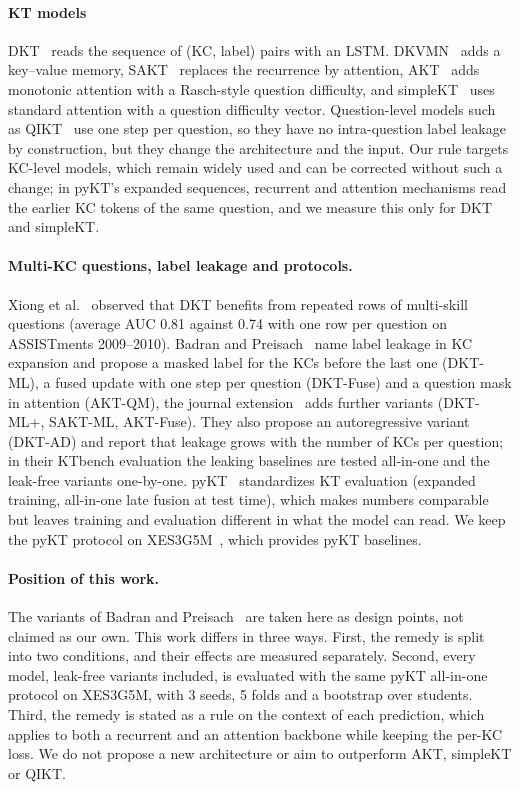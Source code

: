 \paragraph{KT models}
DKT~\cite{piech2015deep} reads the sequence of (KC, label) pairs with an LSTM. 
DKVMN~\cite{zhang2017dynamic} adds a key--value memory, SAKT~\cite{pandey2019self} replaces the recurrence by attention, AKT~\cite{ghosh2020context} adds monotonic attention with a Rasch-style question difficulty, and simpleKT~\cite{DBLP:conf/iclr/0001L0H023} uses standard attention with a question difficulty vector. 
Question-level models such as QIKT~\cite{chen2023improving} use one step per question, so they have no intra-question label leakage by construction, but they change the architecture and the input. 
Our rule targets KC-level models, which remain widely used and can be corrected without such a change; in pyKT's expanded sequences, recurrent and attention mechanisms read the earlier KC tokens of the same question, and we measure this only for DKT and simpleKT.
 
\paragraph{Multi-KC questions, label leakage and protocols.}
Xiong et al.~\cite{xiong2016going} observed that DKT benefits from repeated rows of multi-skill questions (average AUC 0.81 against 0.74 with one row per question on ASSISTments 2009--2010). 
Badran and Preisach~\cite{DBLP:conf/csedu/BadranP25a} name label leakage in KC expansion and propose a masked label for the KCs before the last one (DKT-ML), a fused update with one step per question (DKT-Fuse) and a question mask in attention (AKT-QM), the journal extension~\cite{badran2026enhancing} adds further variants (DKT-ML+, SAKT-ML, AKT-Fuse). 
They also propose an autoregressive variant (DKT-AD) and report that leakage grows with the number of KCs per question; in their KTbench evaluation the leaking baselines are tested all-in-one and the leak-free variants one-by-one. 
pyKT~\cite{liu2022pykt} standardizes KT evaluation (expanded training, all-in-one late fusion at test time), which makes numbers comparable but leaves training and evaluation different in what the model can read. 
We keep the pyKT protocol on XES3G5M~\cite{liu2023xes3g5m}, which provides pyKT baselines.
 
\paragraph{Position of this work.}
The variants of Badran and Preisach~\cite{badran2026enhancing} are taken here as design points, not claimed as our own. This work differs in three ways. First, the remedy is split into two conditions, and their effects are measured separately. Second, every model, leak-free variants included, is evaluated with the same pyKT all-in-one protocol on XES3G5M, with 3 seeds, 5 folds and a bootstrap over students. Third, the remedy is stated as a rule on the context of each prediction, which applies to both a recurrent and an attention backbone while keeping the per-KC loss. We do not propose a new architecture or aim to outperform AKT, simpleKT or QIKT.